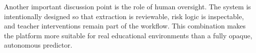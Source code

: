 Another important discussion point is the role of human oversight. The system is intentionally designed so that extraction is reviewable, risk logic is inspectable, and teacher interventions remain part of the workflow. This combination makes the platform more suitable for real educational environments than a fully opaque, autonomous predictor.

